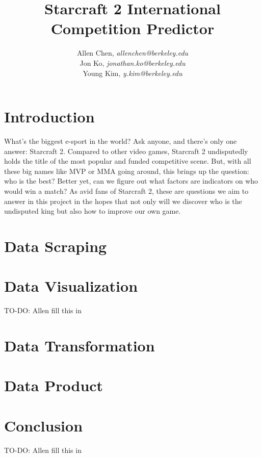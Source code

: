 \documentclass[10pt]{handout}
\author{
  Allen Chen, \emph{allenchen@berkeley.edu}\\
  Jon Ko, \emph{jonathan.ko@berkeley.edu}\\
  Young Kim, \emph{y.kim@berkeley.edu}\\
}
\title{Starcraft 2 International Competition Predictor}
\begin{document}
\maketitle

\section{Introduction}
What's the biggest e-sport in the world? Ask anyone, and there's only one answer: Starcraft 2. Compared to other video games, Starcraft 2 undisputedly holds the title of the most popular and funded competitive scene. But, with all these big names like MVP or MMA going around, this brings up the question: who is the best? Better yet, can we figure out what factors are indicators on who would win a match? As avid fans of Starcraft 2, these are questions we aim to answer in this project in the hopes that not only will we discover who is the undisputed king but also how to improve our own game.

\section{Data Scraping}


\section{Data Visualization}
TO-DO: Allen fill this in


\section{Data Transformation}


\section{Data Product}


\section{Conclusion}
TO-DO: Allen fill this in
\end{document}
